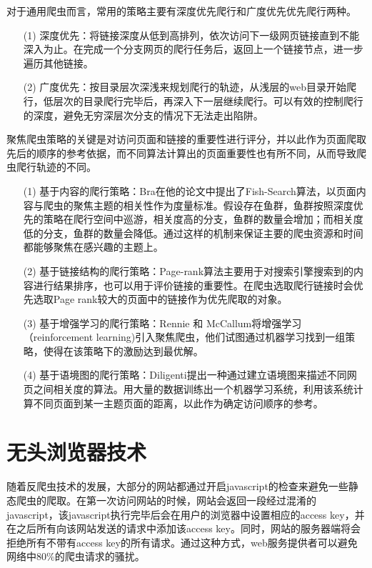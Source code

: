 \documentclass[doctor,privacy,twoside]{buaa_mac}
\begin{document}
对于通用爬虫而言，常用的策略主要有深度优先爬行和广度优先优先爬行两种。
\begin{itemize}
\item[(1)] 深度优先：将链接深度从低到高排列，依次访问下一级网页链接直到不能深入为止。在完成一个分支网页的爬行任务后，返回上一个链接节点，进一步遍历其他链接。
\item[(2)] 广度优先：按目录层次深浅来规划爬行的轨迹，从浅层的web目录开始爬行，低层次的目录爬行完毕后，再深入下一层继续爬行。可以有效的控制爬行的深度，避免无穷深层次分支的情况下无法走出陷阱。
\end{itemize}

聚焦爬虫策略的关键是对访问页面和链接的重要性进行评分，并以此作为页面爬取先后的顺序的参考依据，而不同算法计算出的页面重要性也有所不同，从而导致爬虫爬行轨迹的不同。

\begin{itemize}
\item[(1)] 基于内容的爬行策略：Bra在他的论文中提出了Fish-Search算法，以页面内容与爬虫的聚焦主题的相关性作为度量标准。假设存在鱼群，鱼群按照深度优先的策略在爬行空间中巡游，相关度高的分支，鱼群的数量会增加；而相关度低的分支，鱼群的数量会降低。通过这样的机制来保证主要的爬虫资源和时间都能够聚焦在感兴趣的主题上。 
\item[(2)] 基于链接结构的爬行策略：Page-rank算法主要用于对搜索引擎搜索到的内容进行结果排序，也可以用于评价链接的重要性。在爬虫选取爬行链接时会优先选取Page rank较大的页面中的链接作为优先爬取的对象。
\item[(3)] 基于增强学习的爬行策略：Rennie 和 McCallum将增强学习（reinforcement learning)引入聚焦爬虫，他们试图通过机器学习找到一组策略，使得在该策略下的激励达到最优解。
\item[(4)] 基于语境图的爬行策略：Diligenti提出一种通过建立语境图来描述不同网页之间相关度的算法。用大量的数据训练出一个机器学习系统，利用该系统计算不同页面到某一主题页面的距离，以此作为确定访问顺序的参考。
\end{itemize}


\section{无头浏览器技术}
随着反爬虫技术的发展，大部分的网站都通过开启javascript的检查来避免一些静态爬虫的爬取。在第一次访问网站的时候，网站会返回一段经过混淆的javascript，该javascript执行完毕后会在用户的浏览器中设置相应的access key，并在之后所有向该网站发送的请求中添加该access key。同时，网站的服务器端将会拒绝所有不带有access key的所有请求。通过这种方式，web服务提供者可以避免网络中80\%的爬虫请求的骚扰。
\end{document}
